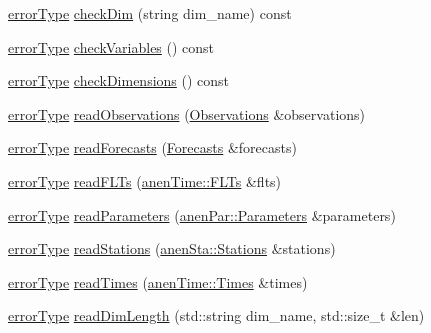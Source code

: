 \begin{DoxyCompactItemize}
\item 
\mbox{\hyperlink{class_an_en_i_o_aa56bc1ec6610b86db4349bce20f9ead0}{error\+Type}} \mbox{\hyperlink{class_an_en_i_o_ab99f9aebd7b145de00fe15b8d4869ac2}{check\+Dim}} (string dim\+\_\+name) const
\item 
\mbox{\hyperlink{class_an_en_i_o_aa56bc1ec6610b86db4349bce20f9ead0}{error\+Type}} \mbox{\hyperlink{class_an_en_i_o_a44347f497bdf775fcf214ec75d8b6470}{check\+Variables}} () const
\item 
\mbox{\hyperlink{class_an_en_i_o_aa56bc1ec6610b86db4349bce20f9ead0}{error\+Type}} \mbox{\hyperlink{class_an_en_i_o_ab6cd06f6402655924002fec4f83195eb}{check\+Dimensions}} () const
\item 
\mbox{\hyperlink{class_an_en_i_o_aa56bc1ec6610b86db4349bce20f9ead0}{error\+Type}} \mbox{\hyperlink{class_an_en_i_o_a41ebcc0c9edee123626bf6e606917a49}{read\+Observations}} (\mbox{\hyperlink{class_observations}{Observations}} \&observations)
\item 
\mbox{\hyperlink{class_an_en_i_o_aa56bc1ec6610b86db4349bce20f9ead0}{error\+Type}} \mbox{\hyperlink{class_an_en_i_o_a912e513e58fa258e1dce67ff161abab2}{read\+Forecasts}} (\mbox{\hyperlink{class_forecasts}{Forecasts}} \&forecasts)
\item 
\mbox{\hyperlink{class_an_en_i_o_aa56bc1ec6610b86db4349bce20f9ead0}{error\+Type}} \mbox{\hyperlink{class_an_en_i_o_aa58735032dd6f54c83d6450842922d3f}{read\+F\+L\+Ts}} (\mbox{\hyperlink{classanen_time_1_1_f_l_ts}{anen\+Time\+::\+F\+L\+Ts}} \&flts)
\item 
\mbox{\hyperlink{class_an_en_i_o_aa56bc1ec6610b86db4349bce20f9ead0}{error\+Type}} \mbox{\hyperlink{class_an_en_i_o_a2b21ff04fcc0464017a5a717a6b19065}{read\+Parameters}} (\mbox{\hyperlink{classanen_par_1_1_parameters}{anen\+Par\+::\+Parameters}} \&parameters)
\item 
\mbox{\hyperlink{class_an_en_i_o_aa56bc1ec6610b86db4349bce20f9ead0}{error\+Type}} \mbox{\hyperlink{class_an_en_i_o_aaec8b46a52f3d8ab904fd4229bd3b9e9}{read\+Stations}} (\mbox{\hyperlink{classanen_sta_1_1_stations}{anen\+Sta\+::\+Stations}} \&stations)
\item 
\mbox{\hyperlink{class_an_en_i_o_aa56bc1ec6610b86db4349bce20f9ead0}{error\+Type}} \mbox{\hyperlink{class_an_en_i_o_a19b454b0a9ecb5ecbc2cc2a9c139770b}{read\+Times}} (\mbox{\hyperlink{classanen_time_1_1_times}{anen\+Time\+::\+Times}} \&times)
\item 
\mbox{\hyperlink{class_an_en_i_o_aa56bc1ec6610b86db4349bce20f9ead0}{error\+Type}} \mbox{\hyperlink{class_an_en_i_o_a5ca1c7df3da9720967d7ed06f2dfe09b}{read\+Dim\+Length}} (std\+::string dim\+\_\+name, std\+::size\+\_\+t \&len)

\end{DoxyCompactItemize}
